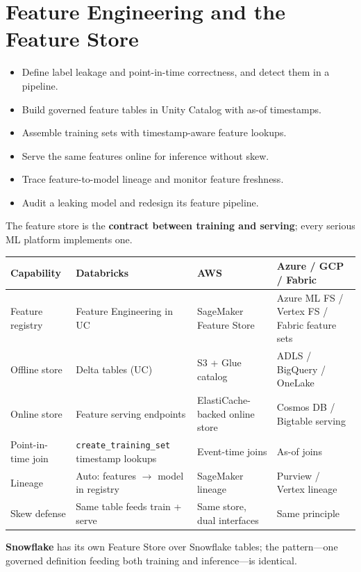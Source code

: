 \chapter{Feature Engineering and the Feature Store}
%
%
\begin{objectives}
\begin{itemize}
    \item Define label leakage and point-in-time correctness, and detect them in a pipeline.
    \item Build governed feature tables in Unity Catalog with as-of timestamps.
    \item Assemble training sets with timestamp-aware feature lookups.
    \item Serve the same features online for inference without skew.
    \item Trace feature-to-model lineage and monitor feature freshness.
    \item Audit a leaking model and redesign its feature pipeline.
\end{itemize}
\end{objectives}

\begin{crosscloud}
The feature store is the \textbf{contract between training and serving}; every serious ML platform
implements one.

\vspace{2mm}
{\footnotesize
\begin{tabular}{@{}p{3.0cm}p{3.4cm}p{3.2cm}p{3.2cm}@{}}
\toprule
\textbf{Capability} & \textbf{Databricks} & \textbf{AWS} & \textbf{Azure / GCP / Fabric} \\
\midrule
Feature registry & Feature Engineering in UC & SageMaker Feature Store & Azure ML FS / Vertex FS / Fabric feature sets \\
Offline store & Delta tables (UC) & S3 + Glue catalog & ADLS / BigQuery / OneLake \\
Online store & Feature serving endpoints & ElastiCache-backed online store & Cosmos DB / Bigtable serving \\
Point-in-time join & \texttt{create\_training\_set} timestamp lookups & Event-time joins & As-of joins \\
Lineage & Auto: features $\rightarrow$ model in registry & SageMaker lineage & Purview / Vertex lineage \\
Skew defense & Same table feeds train + serve & Same store, dual interfaces & Same principle \\
\bottomrule
\end{tabular}}

\vspace{1mm}
\textbf{Snowflake} has its own Feature Store over Snowflake tables; the pattern---one governed
definition feeding both training and inference---is identical.
\end{crosscloud}

